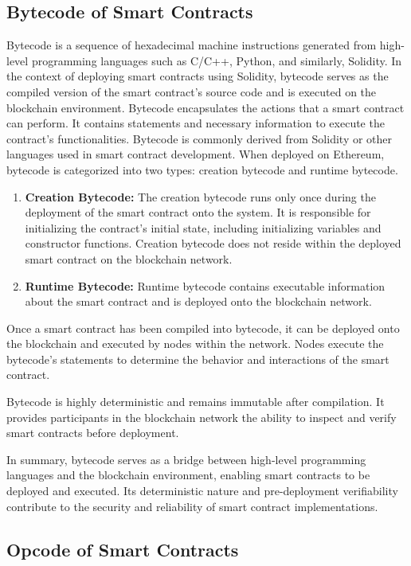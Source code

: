 \subsection{Bytecode of Smart Contracts}
Bytecode is a sequence of hexadecimal machine instructions generated from high-level programming languages such as C/C++, Python, and similarly, Solidity. In the context of deploying smart contracts using Solidity, bytecode serves as the compiled version of the smart contract's source code and is executed on the blockchain environment.
Bytecode encapsulates the actions that a smart contract can perform. It contains statements and necessary information to execute the contract's functionalities. Bytecode is commonly derived from Solidity or other languages used in smart contract development. When deployed on Ethereum, bytecode is categorized into two types: creation bytecode and runtime bytecode.
\begin{enumerate}
    \item \textbf{Creation Bytecode:} The creation bytecode runs only once during the deployment of the smart contract onto the system. It is responsible for initializing the contract's initial state, including initializing variables and constructor functions. Creation bytecode does not reside within the deployed smart contract on the blockchain network.
    \item \textbf{Runtime Bytecode:} Runtime bytecode contains executable information about the smart contract and is deployed onto the blockchain network.
\end{enumerate}
Once a smart contract has been compiled into bytecode, it can be deployed onto the blockchain and executed by nodes within the network. Nodes execute the bytecode's statements to determine the behavior and interactions of the smart contract.

Bytecode is highly deterministic and remains immutable after compilation. It provides participants in the blockchain network the ability to inspect and verify smart contracts before deployment.

In summary, bytecode serves as a bridge between high-level programming languages and the blockchain environment, enabling smart contracts to be deployed and executed. Its deterministic nature and pre-deployment verifiability contribute to the security and reliability of smart contract implementations.

\subsection{Opcode of Smart Contracts}

